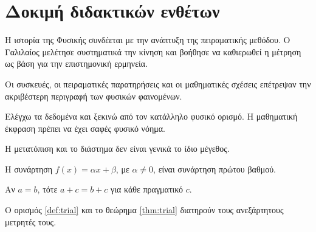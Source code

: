 \chapter{Δοκιμή διδακτικών ενθέτων}
\begin{HistoryBox}
Η ιστορία της Φυσικής συνδέεται με την ανάπτυξη της πειραματικής
μεθόδου. Ο Γαλιλαίος μελέτησε συστηματικά την κίνηση και βοήθησε
να καθιερωθεί η μέτρηση ως βάση για την επιστημονική ερμηνεία.

Οι συσκευές, οι πειραματικές παρατηρήσεις και οι μαθηματικές σχέσεις
επέτρεψαν την ακριβέστερη περιγραφή των φυσικών φαινομένων.
\end{HistoryBox}
\begin{ThinkBox}
Ελέγχω τα δεδομένα και ξεκινώ από τον κατάλληλο φυσικό ορισμό.
Η μαθηματική έκφραση πρέπει να έχει σαφές φυσικό νόημα.
\end{ThinkBox}
\begin{AttentionBox}
Η μετατόπιση και το διάστημα δεν είναι γενικά το ίδιο μέγεθος.
\end{AttentionBox}
\begin{definitionbox}\label{def:trial}
Η συνάρτηση $f(x)=\alpha x+\beta$, με $\alpha\ne 0$, είναι
συνάρτηση πρώτου βαθμού.
\end{definitionbox}
\begin{theorembox}\label{thm:trial}
Αν $a=b$, τότε $a+c=b+c$ για κάθε πραγματικό $c$.
\end{theorembox}
Ο ορισμός \ref{def:trial} και το θεώρημα \ref{thm:trial}
διατηρούν τους ανεξάρτητους μετρητές τους.
